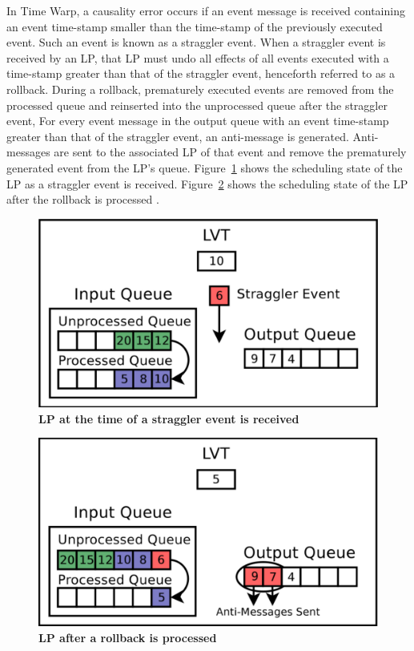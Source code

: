\documentclass[11pt]{book}
\begin{document}
In Time Warp, a causality error occurs if an event message is received containing an event
time-stamp smaller than the time-stamp of the previously executed event.  Such an event is
known as a straggler event.  When a straggler event is received by an LP, that LP must
undo all effects of all events executed with a time-stamp greater than that of the
straggler event, henceforth referred to as a rollback.  During a rollback, prematurely
executed events are removed from the processed queue and reinserted into the unprocessed
queue after the straggler event, For every event message in the output queue with an event
time-stamp greater than that of the straggler event, an anti-message is generated.
Anti-messages are sent to the associated LP of that event and remove the prematurely
generated event from the LP's queue.  Figure~\ref{fig:rollback_stragglerrecvd} shows the
scheduling state of the LP as a straggler event is received.
Figure~\ref{fig:rollback_processed} shows the scheduling state of the LP after the
rollback is processed \cite{dickman}.

\begin{figure}[H]
    \centering
    \graphicspath{ {./figures/} }
    \includegraphics[width=\textwidth,height=\textheight,keepaspectratio]{rollback_recv}
    \caption{\textbf{LP at the time of a straggler event is received}}
    \label{fig:rollback_stragglerrecvd}
\end{figure}

\begin{figure}[H]
    \centering
    \graphicspath{ {./figures/} }
    \includegraphics[width=\textwidth,height=\textheight,keepaspectratio]{rollback_processed}
    \caption{\textbf{LP after a rollback is processed}}
    \label{fig:rollback_processed}
\end{figure}
\end{document}
